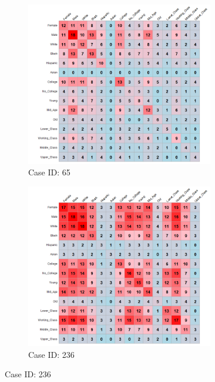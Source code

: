 \documentclass[12pt]{article}
\begin{document}
\begin{figure}[ht!]
    \captionsetup[subfigure]{font=footnotesize,labelfont=footnotesize}
    \centering
     \begin{subfigure}[b]{0.49\textwidth}
        \includegraphics[trim={1cm 0cm 0cm 0cm},clip, width=0.9\textwidth]{Plots/data-ex-cp1.png}
            \caption{Case ID: 65}
            \label{fig:ind-ex-cp1}
    \end{subfigure}
     \begin{subfigure}[b]{0.49\textwidth}
        \includegraphics[trim={1cm 0cm 0cm 0cm},clip, width=0.9\textwidth]{Plots/data-ex-cp2.png}
            \caption{Case ID: 236}

\end{subfigure}
\end{figure}
\end{document}
